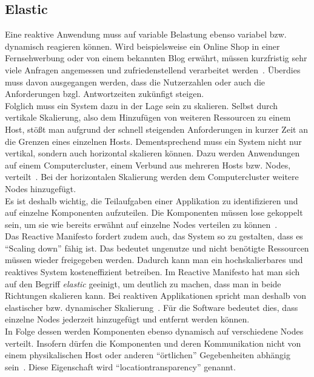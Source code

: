 \subsection{Elastic}\label{subsec:elastic}
Eine reaktive Anwendung muss auf variable Belastung ebenso variabel bzw. dynamisch reagieren können. Wird beispielsweise ein Online Shop in einer Fernsehwerbung oder von einem bekannten Blog erwährt, müssen kurzfristig sehr viele Anfragen angemessen und zufriedenstellend verarbeitet werden~\cite[S.~39]{kuhn_reactive_2015}. Überdies muss davon ausgegangen werden, dass die Nutzerzahlen oder auch die Anforderungen bzgl. Antwortzeiten zukünfigt steigen.\\
Folglich muss ein System dazu in der Lage sein zu skalieren. Selbst durch vertikale Skalierung, also dem Hinzufügen von weiteren Ressourcen zu einem Host, stößt man aufgrund der schnell steigenden Anforderungen in kurzer Zeit an die Grenzen eines einzelnen Hosts. Dementsprechend muss ein System nicht nur vertikal, sondern auch horizontal skalieren können. Dazu werden Anwendungen auf einem Computercluster, einem Verbund aus mehreren Hosts bzw. Nodes, verteilt~\cite[S.~7]{vernon_reactive_2016}. Bei der horizontalen Skalierung werden dem Computercluster weitere Nodes hinzugefügt.\\
Es ist deshalb wichtig, die Teilaufgaben einer Applikation zu identifizieren und auf einzelne Komponenten aufzuteilen. Die Komponenten müssen lose gekoppelt sein, um sie wie bereits erwähnt auf einzelne Nodes verteilen zu können~\cite[S.~40]{kuhn_reactive_2015}.\\
Das Reactive Manifesto fordert zudem auch, das System so zu gestalten, dass es \enquote{Scaling down} fähig ist. Das bedeutet ungenutze und nicht benötigte Ressourcen müssen wieder freigegeben werden. Dadurch kann man ein hochskalierbares und reaktives System kosteneffizient betreiben. Im Reactive Manifesto hat man sich auf den Begriff \textit{elastic} geeinigt, um deutlich zu machen, dass man in beide Richtungen skalieren kann. Bei reaktiven Applikationen spricht man deshalb von elastischer bzw. dynamischer Skalierung~\cite[S.~8]{vernon_reactive_2016}. Für die Software bedeutet dies, dass einzelne Nodes jederzeit hinzugefügt und entfernt werden können.\\
In Folge dessen werden Komponenten ebenso dynamisch auf verschiedene Nodes verteilt. Insofern dürfen die Komponenten und deren Kommunikation nicht von einem physikalischen Host oder anderen \enquote{örtlichen} Gegebenheiten abhängig sein~\cite[S.~8]{vernon_reactive_2016}. Diese Eigenschaft wird \enquote{\gls{locationtransparency}} genannt.\\

